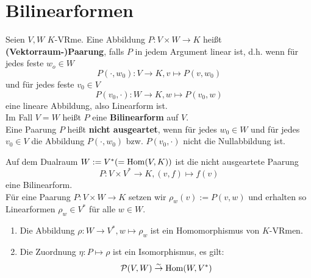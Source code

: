 \documentclass[parskip,a4paper,twoside,DIV15,BCOR12mm]{scrbook}
\begin{document}
\section{Bilinearformen}
\begin{definition}
Seien $V,W$ $K$-VRme. Eine Abbildung $P:V\times W\to K$ heißt 
\textbf{\mbox{(Vektorraum-)}Paarung}, falls $P$ in jedem Argument linear ist, 
d.h. wenn für jedes feste $w_o\in W$ 
\[P(\cdot,w_0):V\to K, v\mapsto P(v,w_0)\]
und für jedes feste $v_0\in V$
\[P(v_0,\cdot):W\to K, w\mapsto P(v_0,w)\]
eine lineare Abbildung, also Linearform ist.\\
Im Fall $V=W$ heißt $P$ eine \textbf{Bilinearform} auf $V$.\\
Eine Paarung $P$ heißt \textbf{nicht ausgeartet}, wenn für jedes $w_0\in W$ 
und für jedes $v_0\in V$ die Abbildung $P(\cdot,w_0)$ bzw. $P(v_0,\cdot)$ 
nicht die Nullabbildung ist.
\end{definition}

\begin{comment}
Die Menge $\mathcal{P}(V,W)$ aller Paarungen von $V$ und $W$ ist ein Untervektorraum
des $K$-VRms $\Abb(V\times W,K)$ aller Abbildungen von $V\times W$ nach $K$.
\end{comment}

\begin{example}
Auf dem Dualraum $W:=V^*(=\operatorname{Hom}(V,K))$ ist die nicht ausgeartete Paarung
\[P:V\times V^*\to K,(v,f)\mapsto f(v)\]
eine Bilinearform.\\
Für eine Paarung $P:V\times W\to K$ setzen wir $\rho_w(v):=P(v,w)$ und erhalten
so Linearformen $\rho_w\in V^*$ für alle $w\in W$.
\end{example}

\begin{theo}
\label{Satz 15.1}
\begin{enumerate}
\item Die Abbildung $\rho:W\to V^*,w\mapsto \rho_w$ ist ein Homomorphismus
von $K$-VRmen.
\item Die Zuordnung $\eta:P\mapsto \rho$ ist ein Isomorphismus, es gilt:
\[\mathcal{P}(V,W)\stackrel{\sim}{\to} \operatorname{Hom}(W,V^*)\]
\end{enumerate}
\end{theo}
\end{document}
